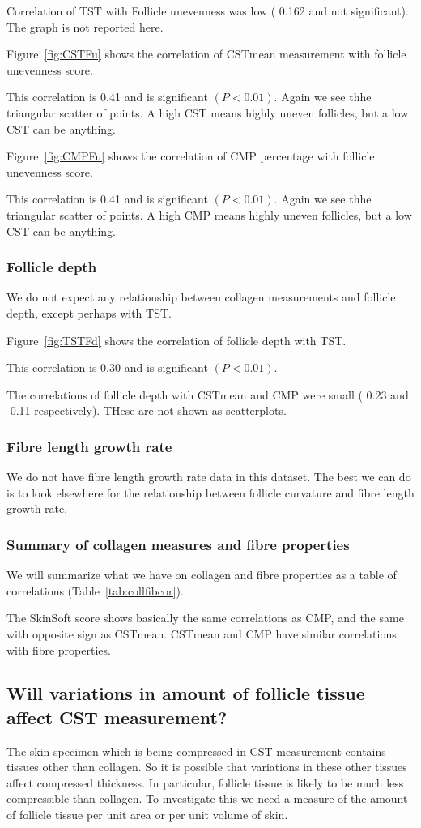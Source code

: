 \documentclass[titlepage]{article}  %
\begin{document}
Correlation of TST with Follicle unevenness was low ( 0.162 and not significant). The graph is not reported here.

Figure~\ref{fig:CSTFu} shows the correlation of CSTmean measurement with follicle unevenness score.

This correlation is 0.41 and is significant $(P<0.01)$. Again we see thhe triangular scatter of points. A high CST means highly uneven follicles, but a low CST can be anything.

Figure~\ref{fig:CMPFu} shows the correlation of CMP percentage with follicle unevenness score.

This correlation is 0.41 and is significant $(P<0.01)$. Again we see thhe triangular scatter of points. A high CMP means highly uneven follicles, but a low CST can be anything.


\subsubsection{Follicle depth}
We do not expect any relationship between collagen measurements and follicle depth, except perhaps with TST.

Figure~\ref{fig:TSTFd} shows the correlation of follicle depth with TST.

This correlation is 0.30 and is significant $(P<0.01)$.

The correlations of follicle depth with CSTmean and CMP were small ( 0.23 and -0.11 respectively). THese are not shown as scatterplots.

\subsubsection{Fibre length growth rate}
We do not have fibre length growth rate data in this dataset.  The best we can do is to look elsewhere for the relationship between follicle curvature and fibre length growth rate. 

\subsubsection{Summary of collagen measures and fibre properties}


We will summarize what we have on collagen and fibre properties as a table of correlations (Table~\ref{tab:collfibcor}).

The SkinSoft score shows basically the same correlations as CMP, and the same with opposite sign as CSTmean. CSTmean and CMP have similar correlations with fibre properties.

\subsection{Will variations in amount of follicle tissue affect CST measurement?}
The skin specimen which is being compressed in CST measurement contains tissues other than collagen. So it is possible that variations in these other tissues affect compressed thickness. In particular, follicle tissue is likely to be much less compressible than collagen. To investigate this we need a measure of the amount of follicle tissue per unit area or per unit volume of skin. 
\end{document}

